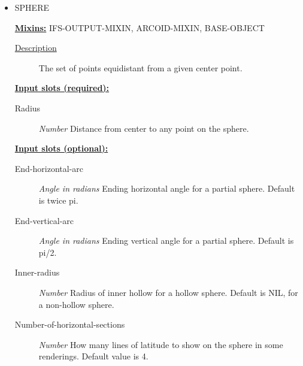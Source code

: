 \documentclass [11pt]{book}
\begin{document}
\begin{itemize}
\begin{description}
\end{description}







\item {}SPHERE


\textbf{
\underline{Mixins:}} IFS-OUTPUT-MIXIN, ARCOID-MIXIN, BASE-OBJECT





\begin{description}

\item [
\underline{Description}]


The set of points equidistant from a given center point.



\end{description}








\textbf{
\underline{Input slots (required):}}

\begin{description}

\item [Radius]
\emph{Number} Distance from center to any point on the sphere.


\end{description}






\textbf{
\underline{Input slots (optional):}}

\begin{description}

\item [End-horizontal-arc]
\emph{Angle in radians} Ending horizontal angle for a partial sphere. Default is twice pi.


\item [End-vertical-arc]
\emph{Angle in radians} Ending vertical angle for a partial sphere. Default is pi/2.


\item [Inner-radius]
\emph{Number} Radius of inner hollow for a hollow sphere. Default is NIL, for a non-hollow sphere.


\item [Number-of-horizontal-sections]
\emph{Number} How many lines of latitude to show on the sphere in some renderings. Default value is 4.



\end{description}
\end{itemize}
\end{document}
